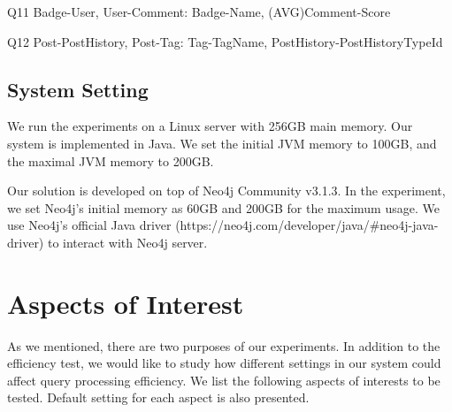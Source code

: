 Q11 \hspace{1.3mm} Badge-User, User-Comment: Badge-Name, (AVG)Comment-Score

Q12 \hspace{1.3mm} Post-PostHistory, Post-Tag: Tag-TagName, PostHistory-PostHistoryTypeId





\subsection{System Setting}

We run the experiments on a Linux server with 256GB main memory. Our system is implemented in Java. We set the initial JVM memory to 100GB, and the maximal JVM memory to 200GB.

Our solution is developed on top of Neo4j Community v3.1.3. In the experiment, we set Neo4j's initial memory as 60GB and 200GB for the maximum usage. We use Neo4j's official Java driver (https://neo4j.com/developer/java/\#neo4j-java-driver) to interact with Neo4j server.

\section{Aspects of Interest}
\label{Aspects of Interest}

As we mentioned, there are two purposes of our experiments. In addition to the efficiency test, we would like to study how different settings in our system could affect query processing efficiency. We list the following aspects of interests to be tested. Default setting for each aspect is also presented. 

